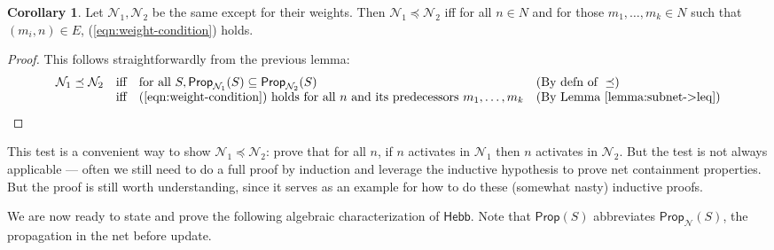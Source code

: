 \documentclass[letterpaper]{article}
\theoremstyle{definition}
\newtheorem{corollary}{Corollary}
\newcommand{\Prop}{\textsf{Prop}}
\newcommand{\Inc}{\textsf{Hebb}}
\newcommand{\Net}{\mathcal{N}}
\begin{document}
\begin{corollary}
\label{corollary:subnet->weights}
Let $\Net_1, \Net_2$ be the same except for their weights.  Then $\Net_1 \preceq \Net_2$ iff for all $n \in N$ and for those $m_1, \ldots, m_k \in N$ such that $(m_i, n) \in E$, (\ref{eqn:weight-condition}) holds.
\end{corollary}
\begin{proof}
This follows straightforwardly from the previous lemma:
\[
\begin{array}{lcll}
    \Net_1 \preceq \Net_2 & \mbox{iff} & \mbox{for all } S, \Prop_{\Net_1}(S) \subseteq \Prop_{\Net_2}(S) & (\mbox{By defn of } \preceq) \\
    & \mbox{iff} & \mbox{(\ref{eqn:weight-condition}) holds for all } n \mbox{ and its predecessors }m_1, \ldots, m_k & (\mbox{By Lemma~\ref{lemma:subnet->leq}})
\end{array} \qedhere
\]
\end{proof}
This test is a convenient way to show $\Net_1 \preceq \Net_2$: prove that for all $n$, if $n$ activates in $\Net_1$ then $n$ activates in $\Net_2$. But the test is not always applicable --- often we still need to do a full proof by induction and leverage the inductive hypothesis to prove net containment properties. But the proof is still worth understanding, since it serves as an example for how to do these (somewhat nasty) inductive proofs.

We are now ready to state and prove the following algebraic characterization of $\Inc$. Note that $\Prop(S)$ abbreviates $\Prop_\Net(S)$, the propagation in the net before update.
\end{document}
